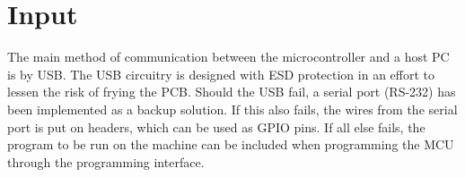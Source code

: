 \documentclass[../main/report.tex]{subfiles}
\begin{document}
\section{Input}

The main method of communication between the microcontroller and a host PC is by USB.
The USB circuitry is designed with ESD protection in an effort to lessen the risk of frying the PCB.
Should the USB fail, a serial port (RS-232) has been implemented as a backup solution.
If this also fails, the wires from the serial port is put on headers, which can be used as GPIO pins.
If all else fails, the program to be run on the machine can be included when programming the MCU through the programming interface.
\end{document}
